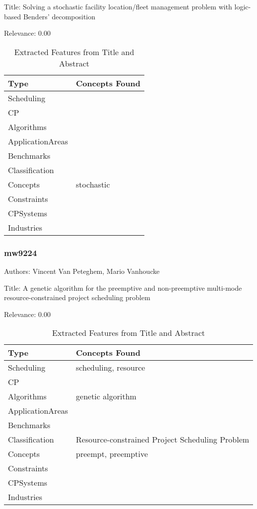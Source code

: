 Title: Solving a stochastic facility location/fleet management problem with logic-based Benders' decomposition

Relevance:  0.00

{\scriptsize
\begin{longtable}{p{2cm}p{20cm}}
\caption{Extracted Features from Title and Abstract}\\ \toprule
Type & Concepts Found\\ \midrule
\endhead
\bottomrule
\endfoot
Scheduling & \\ 
CP & \\ 
Algorithms & \\ 
ApplicationAreas & \\ 
Benchmarks & \\ 
Classification & \\ 
Concepts & stochastic\\ 
Constraints & \\ 
CPSystems & \\ 
Industries & \\ 
\end{longtable}
}



\subsubsection{mw9224}
\label{mw:mw9224}

Authors: Vincent Van Peteghem, Mario Vanhoucke

Title: A genetic algorithm for the preemptive and non-preemptive multi-mode resource-constrained project scheduling problem

Relevance:  0.00

{\scriptsize
\begin{longtable}{p{2cm}p{20cm}}
\caption{Extracted Features from Title and Abstract}\\ \toprule
Type & Concepts Found\\ \midrule
\endhead
\bottomrule
\endfoot
Scheduling & scheduling, resource\\ 
CP & \\ 
Algorithms & genetic algorithm\\ 
ApplicationAreas & \\ 
Benchmarks & \\ 
Classification & Resource-constrained Project Scheduling Problem\\ 
Concepts & preempt, preemptive\\ 
Constraints & \\ 
CPSystems & \\ 
Industries & \\ 
\end{longtable}
}



